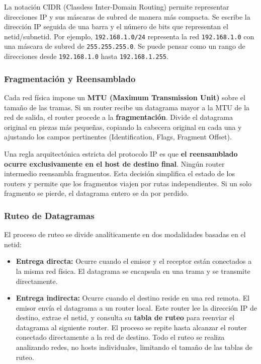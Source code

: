 \begin{obs}
  La notación CIDR (Classless Inter-Domain Routing) permite representar direcciones IP y sus máscaras de subred de manera más compacta. Se escribe la dirección IP seguida de una barra y el número de bits que representan el netid/subnetid. Por ejemplo, \texttt{192.168.1.0/24} representa la red \texttt{192.168.1.0} con una máscara de subred de \texttt{255.255.255.0}. Se puede pensar como un rango de direcciones desde \texttt{192.168.1.0} hasta \texttt{192.168.1.255}.
\end{obs}

\subsubsection{Fragmentación y Reensamblado}
Cada red física impone un \textbf{MTU (Maximum Transmission Unit)} sobre el tamaño de las tramas. Si un router recibe un datagrama mayor a la MTU de la red de salida, el router procede a la \textbf{fragmentación}. Divide el datagrama original en piezas más pequeñas, copiando la cabecera original en cada una y ajustando los campos pertinentes (Identification, Flags, Fragment Offset).

Una regla arquitectónica estricta del protocolo IP es que \textbf{el reensamblado ocurre exclusivamente en el host de destino final}. Ningún router intermedio reensambla fragmentos. Esta decisión simplifica el estado de los routers y permite que los fragmentos viajen por rutas independientes. Si un solo fragmento se pierde, el datagrama entero se da por perdido.

\subsubsection{Ruteo de Datagramas}
El proceso de ruteo se divide analíticamente en dos modalidades basadas en el netid:
\begin{itemize}
    \item \textbf{Entrega directa:} Ocurre cuando el emisor y el receptor están conectados a la misma red física. El datagrama se encapsula en una trama y se transmite directamente.
    \item \textbf{Entrega indirecta:} Ocurre cuando el destino reside en una red remota. El emisor envía el datagrama a un router local. Este router lee la dirección IP de destino, extrae el netid, y consulta su \textbf{tabla de ruteo} para reenviar el datagrama al siguiente router. El proceso se repite hasta alcanzar el router conectado directamente a la red de destino. Todo el ruteo se realiza analizando redes, no hosts individuales, limitando el tamaño de las tablas de ruteo.
\end{itemize}

